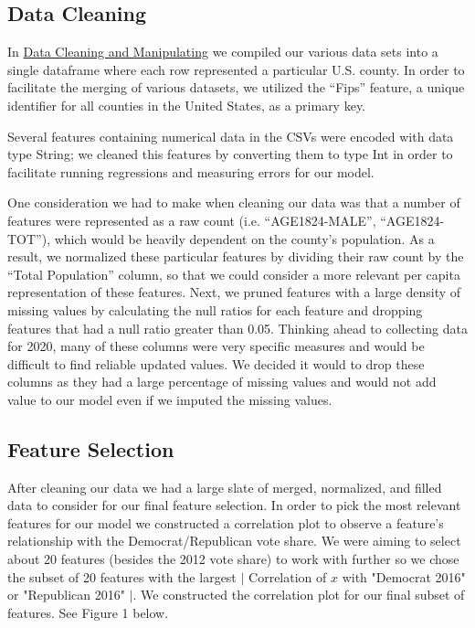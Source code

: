 \documentclass[letterpaper, twocolumn]{article}
\begin{document}
\subsection{Data Cleaning}

In \href{https://tinyurl.com/y2f33unc}{Data Cleaning and Manipulating} we compiled our various data sets into a single dataframe where each row represented a particular U.S. county. In order to facilitate the merging of various datasets, we utilized the “Fips” feature, a unique identifier for all counties in the United States, as a primary key.

Several features containing numerical data in the CSVs were encoded with data type String; we cleaned this features by converting them to type Int in order to facilitate running regressions and measuring errors for our model.

One consideration we had to make when cleaning our data was that a number of features were represented as a raw count (i.e. “AGE1824-MALE”, “AGE1824-TOT”), which would be heavily dependent on the county’s population. As a result, we normalized these particular features by dividing their raw count by the “Total Population” column, so that we could consider a more relevant per capita representation of these features. Next, we pruned features with a large density of missing values by calculating the null ratios for each feature and dropping features that had a null ratio greater than 0.05. Thinking ahead to collecting data for 2020, many of these columns were very specific measures and would be difficult to find reliable updated values. We decided it would to drop these columns as they had a large percentage of missing values and would not add value to our model even if we imputed the missing values. 


\subsection{Feature Selection}

After cleaning our data we had a large slate of merged, normalized, and filled data to consider for our final feature selection. In order to pick the most relevant features for our model we constructed a correlation plot to observe a feature’s relationship with the  Democrat/Republican vote share. We were aiming to select about 20 features (besides the 2012 vote share) to work with further so we chose the subset of 20 features with the largest $\mid$ Correlation of \begin{math} x \end{math} with "Democrat 2016" or "Republican 2016" $\mid$. We constructed the correlation plot for our final subset of features. See Figure 1 below.
\end{document}
